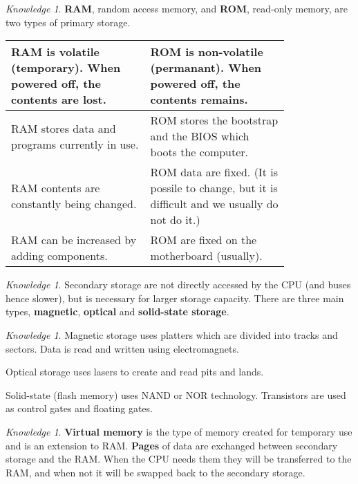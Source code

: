 \documentclass[8pt]{article}
\theoremstyle{remark}
\newtheorem{knowledge}[method]{Knowledge}
\begin{document}
            \begin{knowledge}
                \textbf{RAM}, random access memory, and \textbf{ROM}, read-only memory, are two types of primary storage.

                \begin{center}
                    \begin{tabular}{p{0.4\linewidth}|p{0.4\linewidth}}
                        RAM is volatile (temporary). When powered off, the contents are lost. & ROM is non-volatile (permanant). When powered off, the contents remains.\\\hline
                        RAM stores data and programs currently in use. & ROM stores the bootstrap and the BIOS which boots the computer.\\\hline
                        RAM contents are constantly being changed. & ROM data are fixed. (It is possile to change, but it is difficult and we usually do not do it.)\\\hline
                        RAM can be increased by adding components. & ROM are fixed on the motherboard (usually).
                    \end{tabular}
                \end{center}
            \end{knowledge}

            \begin{knowledge}
                Secondary storage are not directly accessed by the CPU (and buses hence slower), but is necessary for larger storage capacity. There are three main types, \textbf{magnetic}, \textbf{optical} and \textbf{solid-state storage}.
            \end{knowledge}

            \begin{knowledge}
                Magnetic storage uses platters which are divided into tracks and sectors. Data is read and written using electromagnets.
                
                Optical storage uses lasers to create and read pits and lands.
                
                Solid-state (flash memory) uses NAND or NOR technology. Transistors are used as control gates and floating gates.
            \end{knowledge}

            \begin{knowledge}
                \textbf{Virtual memory} is the type of memory created for temporary use and is an extension to RAM. \textbf{Pages} of data are exchanged between secondary storage and the RAM. When the CPU needs them they will be transferred to the RAM, and when not it will be swapped back to the secondary storage.
            \end{knowledge}
\end{document}
